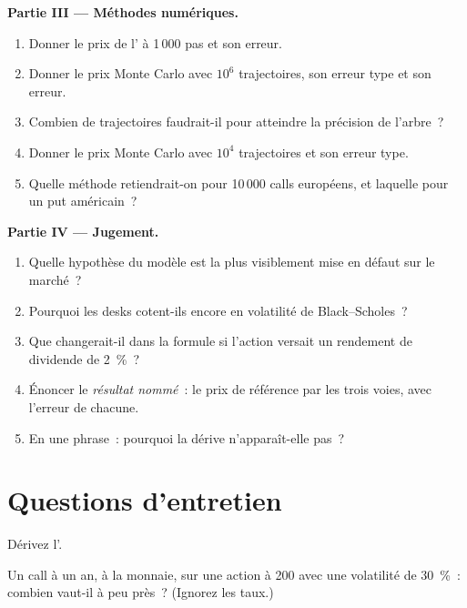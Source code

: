 \begin{problem}
\medskip\noindent\textbf{Partie III --- Méthodes numériques.}
\begin{enumerate}[resume]
\item Donner le prix de l' à 1\,000 pas et son erreur.
\item Donner le prix Monte Carlo avec $10^6$ trajectoires, son erreur type et son erreur.
\item Combien de trajectoires faudrait-il pour atteindre la précision de l'arbre~?
\item Donner le prix Monte Carlo avec $10^4$ trajectoires et son erreur type.
\item Quelle méthode retiendrait-on pour 10\,000 calls européens, et laquelle pour un
put américain~?
\end{enumerate}

\medskip\noindent\textbf{Partie IV --- Jugement.}
\begin{enumerate}[resume]
\item Quelle hypothèse du modèle est la plus visiblement mise en défaut sur le marché~?
\item Pourquoi les desks cotent-ils encore en volatilité de Black--Scholes~?
\item Que changerait-il dans la formule si l'action versait un rendement de dividende de 2~\%~?
\item Énoncer le \emph{résultat nommé}~: le prix de référence par les trois voies, avec
l'erreur de chacune.
\item En une phrase~: pourquoi la dérive n'apparaît-elle pas~?
\end{enumerate}
\end{problem}

\section{Questions d'entretien}

\begin{interviewq}\label{iq:dv:black-scholes-three-ways:1}
Dérivez l'.
\end{interviewq}

\begin{interviewq}\label{iq:dv:black-scholes-three-ways:2}
Un call à un an, à la monnaie, sur une action à 200 avec une volatilité de 30~\%~:
combien vaut-il à peu près~? (Ignorez les taux.)
\end{interviewq}

